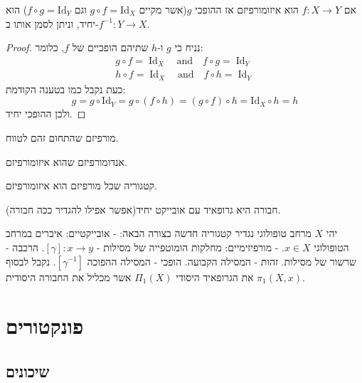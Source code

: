 \documentclass{tstextbook}
\begin{document}
\begin{proposition}
אם \(f:X\to Y\) הוא איזומורפיזם אז ההופכי \(g\)(אשר מקיים \(g\circ f = \mathrm{Id}_{X}\) וגם \(f\circ g=\mathrm{Id}_{Y}\)) הוא יחיד, וניתן לסמן אותו ב-\(f^{-1}:Y\to X\).

\end{proposition}
\begin{proof}
נניח כי \(g\) ו-\(h\) שתיהם הופכיים של \(f\), כלומר:
\begin{gather*}g\circ f=\operatorname{Id}_{X}\quad{\mathrm{and}}\quad f\circ g=\operatorname{Id}_{Y} \\h\circ f=\operatorname{Id}_{X}\quad{\mathrm{and}}\quad f\circ h=\operatorname{Id}_{Y}
\end{gather*}
כעת נקבל כמו בטענה הקודמת:
$$g=g\circ{\mathrm{Id}}_{Y}=g\circ(f\circ h)=(g\circ f)\circ h={\mathrm{Id}}_{X}\circ h=h$$
ולכן ההופכי יחיד.

\end{proof}
\begin{definition}[אנדומורפיזם]
מורפיזם שהתחום זהם לטווח.

\end{definition}
\begin{definition}[אוטומורפיזם]
אנדומורפיזם שהוא איזומורפיזם.

\end{definition}
\begin{definition}[גרופויד]
קטגוריה שכל מורפיזם הוא איזומורפיזם.

\end{definition}
\begin{example}
חבורה היא גרופאיד עם אובייקט יחיד(אפשר אפילו להגדיר ככה חבורה).

\end{example}
\begin{example}
יהי \(X\) מרחב טופולוגי נגדיר קטגוריה חדשה בצורה הבאה:
- אובייקטיים: איברים במרחב הטופולוגי \(x \in X\).
- מורפיזימיים: מחלקות הומוטפייה של מסילות - \(\left[ \gamma \right]:x\to y\).
הרכבה - שרשור של מסילות.
זהות - המסילה הקבועה.
הופכי - המסילה ההפוכה \(\left[ \gamma ^{-1} \right]\).
נקבל לבסוף את הגרופאיד היסודי \(\Pi_{1}(X)\) אשר מכליל את החבורה היסודית \(\pi_{1}(X,x)\).

\end{example}
\chapter{פונקטורים}

\section{שיכונים}
\end{document}
